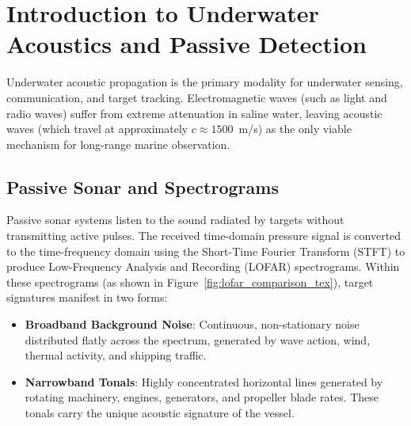 \documentclass[12pt,a4paper]{article}
\begin{document}
\section{Introduction to Underwater Acoustics and Passive Detection}

Underwater acoustic propagation is the primary modality for underwater sensing, communication, and target tracking. Electromagnetic waves (such as light and radio waves) suffer from extreme attenuation in saline water, leaving acoustic waves (which travel at approximately $c \approx 1500$~m/s) as the only viable mechanism for long-range marine observation. 

\subsection{Passive Sonar and Spectrograms}
Passive sonar systems listen to the sound radiated by targets without transmitting active pulses. The received time-domain pressure signal is converted to the time-frequency domain using the Short-Time Fourier Transform (STFT) to produce Low-Frequency Analysis and Recording (LOFAR) spectrograms. Within these spectrograms (as shown in Figure~\ref{fig:lofar_comparison_tex}), target signatures manifest in two forms:
\begin{itemize}
    \item \textbf{Broadband Background Noise}: Continuous, non-stationary noise distributed flatly across the spectrum, generated by wave action, wind, thermal activity, and shipping traffic.
    \item \textbf{Narrowband Tonals}: Highly concentrated horizontal lines generated by rotating machinery, engines, generators, and propeller blade rates. These tonals carry the unique acoustic signature of the vessel.
\end{itemize}
\end{document}
